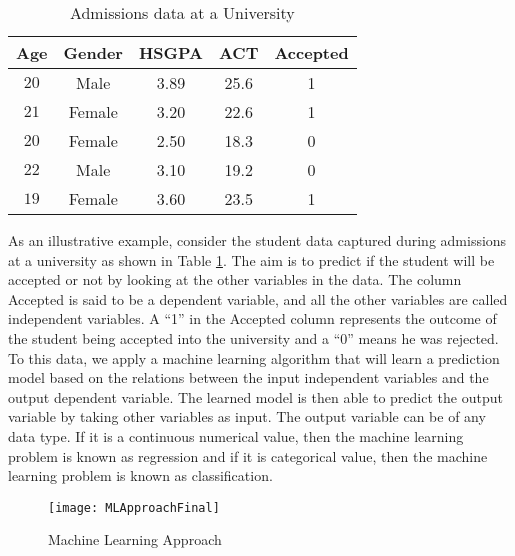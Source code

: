 \documentclass[11pt,openright]{report}
\begin{document}
 \begin{table}[!t]
	\renewcommand{\arraystretch}{1.3}
	\caption{Admissions data at a University}
	\label{table:example_db}
	\centering
	\begin{tabular}{|c|c|c|c|c|}
		\hline
		\bfseries Age & \bfseries Gender & \bfseries HSGPA & \bfseries ACT & \bfseries Accepted\\
		\hline
		$20$ & Male & 3.89 & 25.6 & 1\\ \hline
		$21$ & Female & 3.20 & 22.6 & 1\\ \hline
		$20$ & Female & 2.50 & 18.3 & 0\\ \hline
		$22$ & Male & 3.10 &  19.2 & 0\\ \hline
		$19$ & Female & 3.60 & 23.5 & 1\\ \hline
	\end{tabular}
\end{table}

As an illustrative example, consider the student data captured during admissions at a university as shown in Table  \ref{table:example_db}. The aim is to predict if the student will be accepted or not by looking at the other variables in the data. The column Accepted is said to be a dependent variable, and all the other variables are called independent variables. A ``1'' in the Accepted column represents the outcome of the student being accepted into the university and a ``0'' means he was rejected. To this data, we apply a machine learning algorithm that will learn a prediction model based on the relations between the input independent variables and the output dependent variable. The learned model is then able to predict the output variable by taking other variables as input. The output variable can be of any data type. If it is a continuous numerical value, then the machine learning problem is known as regression and if it is categorical value, then the machine learning problem is known as classification.
  \begin{figure}
	\centering
	\texttt{[image: MLApproachFinal]}
	\caption{Machine Learning Approach}
	\label{fig:predictive_analysis-approach}
\end{figure} 
\end{document}

